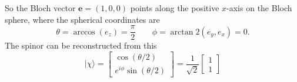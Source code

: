 \documentclass[../../../main.tex]{subfiles}
\begin{document}
So the Bloch vector $\mathbf{e}=(1,0,0)$ points along the positive $x$-axis on the Bloch sphere, where the spherical coordinates are
\begin{equation*}
    \theta = \arccos(e_z) = \frac{\pi}{2}\qquad
    \phi = \arctan2(e_y, e_x) = 0.
\end{equation*}
The spinor can be reconstructed from this
\begin{equation*}
    |\chi\rangle = \begin{bmatrix}
        \cos(\theta/2) \\
        e^{i\phi} \sin(\theta/2)
    \end{bmatrix}
    = \frac{1}{\sqrt{2}} \begin{bmatrix}
        1 \\
        1
    \end{bmatrix}
\end{equation*}
\end{document}
